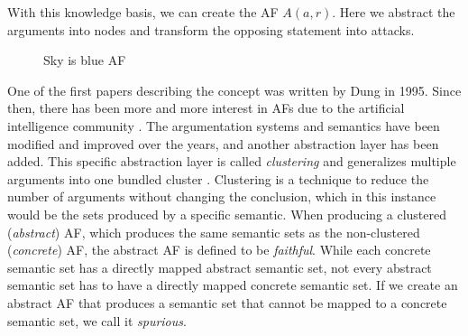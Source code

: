 With this knowledge basis, we can create the \ac{AF} $A(a, r)$. Here we abstract the arguments into nodes and transform the opposing statement into attacks.

\vspace{0.3cm}
\begin{figure}[h!]
    \centering
    \caption{Sky is blue \ac{AF}}
\end{figure}


One of the first papers describing the concept was written by Dung \cite{Dung1995-DUNOTA-2} in 1995. Since then, there has been more and more interest in \acp{AF} due to the artificial intelligence community \cite{DBLP:books/ox/22/CocarascuC0T22}. The argumentation systems and semantics have been modified and improved over the years, and another abstraction layer has been added. This specific abstraction layer is called \emph{clustering} and generalizes multiple arguments into one bundled cluster \cite{DBLP:conf/kr/SaribaturW21}. Clustering is a technique to reduce the number of arguments without changing the conclusion, which in this instance would be the sets produced by a specific semantic. When producing a clustered (\emph{abstract}) \ac{AF}, which produces the same semantic sets as the non-clustered (\emph{concrete}) \ac{AF}, the abstract \ac{AF} is defined to be \emph{faithful}. While each concrete semantic set has a directly mapped abstract semantic set, not every abstract semantic set has to have a directly mapped concrete semantic set. If we create an abstract \ac{AF} that produces a semantic set that cannot be mapped to a concrete semantic set, we call it \emph{spurious}.

